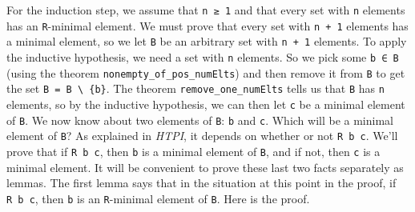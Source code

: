 \documentclass[
  letterpaper,
  DIV=11,
  numbers=noendperiod]{scrreprt}
\theoremstyle{remark}
\begin{document}
For the induction step, we assume that \texttt{n\ ≥\ 1} and that every
set with \texttt{n} elements has an \texttt{R}-minimal element. We must
prove that every set with \texttt{n\ +\ 1} elements has a minimal
element, so we let \texttt{B} be an arbitrary set with \texttt{n\ +\ 1}
elements. To apply the inductive hypothesis, we need a set with
\texttt{n} elements. So we pick some \texttt{b\ ∈\ B} (using the theorem
\texttt{nonempty\_of\_pos\_numElts}) and then remove it from \texttt{B}
to get the set
\texttt{B\textquotesingle{}\ =\ B\ \textbackslash{}\ \{b\}}. The theorem
\texttt{remove\_one\_numElts} tells us that \texttt{B\textquotesingle{}}
has \texttt{n} elements, so by the inductive hypothesis, we can then let
\texttt{c} be a minimal element of \texttt{B\textquotesingle{}}. We now
know about two elements of \texttt{B}: \texttt{b} and \texttt{c}. Which
will be a minimal element of \texttt{B}? As explained in \emph{HTPI}, it
depends on whether or not \texttt{R\ b\ c}. We'll prove that if
\texttt{R\ b\ c}, then \texttt{b} is a minimal element of \texttt{B},
and if not, then \texttt{c} is a minimal element. It will be convenient
to prove these last two facts separately as lemmas. The first lemma says
that in the situation at this point in the proof, if \texttt{R\ b\ c},
then \texttt{b} is an \texttt{R}-minimal element of \texttt{B}. Here is
the proof.
\end{document}
